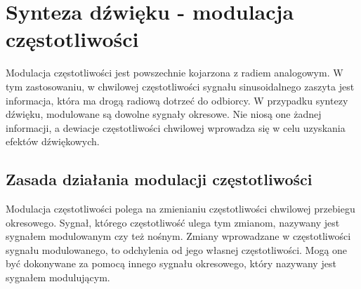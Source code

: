 \chapter{Synteza dźwięku - modulacja częstotliwości}\label{chapter_fm}
Modulacja częstotliwości jest powszechnie kojarzona z radiem analogowym. W tym zastosowaniu, w chwilowej częstotliwości sygnału sinusoidalnego zaszyta jest informacja, która ma drogą radiową dotrzeć do odbiorcy. W przypadku syntezy dźwięku, modulowane są dowolne sygnały okresowe. Nie niosą one żadnej informacji, a dewiacje częstotliwości chwilowej wprowadza się w celu uzyskania efektów dźwiękowych.
\section{Zasada działania modulacji częstotliwości}
Modulacja częstotliwości polega na zmienianiu częstotliwości chwilowej przebiegu okresowego. Sygnał, którego częstotliwość ulega tym zmianom, nazywany jest sygnałem modulowanym czy też nośnym. Zmiany wprowadzane w częstotliwości sygnału modulowanego, to odchylenia od jego własnej częstotliwości. Mogą one być dokonywane za pomocą innego sygnału okresowego, który nazywany jest sygnałem modulującym. 
